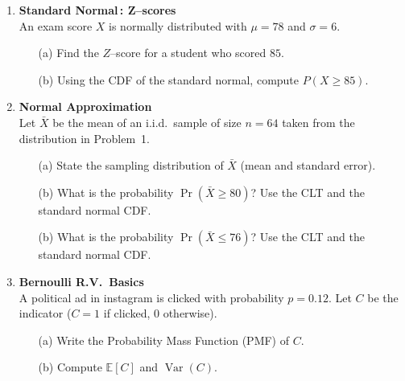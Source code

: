 \documentclass{article}
\begin{document}
\begin{enumerate}
    \item \textbf{Standard Normal\,:  Z–scores}  \\
          An exam score $X$ is normally distributed with $\mu = 78$ and $\sigma = 6$.  
          \begin{enumerate}
              \item[(a)] Find the $Z$–score for a student who scored $85$.  
              \item[(b)] Using the CDF of the standard normal, compute $P(X \ge 85)$.  
          \end{enumerate}

    \item \textbf{Normal Approximation}  \\
          Let $\bar{X}$ be the mean of an i.i.d.\ sample of size $n=64$ taken from the distribution in Problem~1.  
          \begin{enumerate}
              \item[(a)] State the sampling distribution of $\bar{X}$ (mean and standard error).  
              \item[(b)] What is the probability $\Pr(\bar{X}\geq 80)$? Use the CLT and the standard normal CDF.  
              \item[(b)] What is the probability $\Pr(\bar{X}\leq 76)$? Use the CLT and the standard normal CDF.  
          \end{enumerate}

    \item \textbf{Bernoulli R.V.\ Basics}  \\
          A political ad in instagram is clicked with probability $p=0.12$.  Let $C$ be the indicator ($C=1$ if clicked, $0$ otherwise).  
          \begin{enumerate}
              \item[(a)] Write the Probability Mass Function (PMF) of $C$.  
              \item[(b)] Compute $\mathbb{E}[C]$ and $\operatorname{Var}(C)$.  
          \end{enumerate}


\end{enumerate}
\end{document}
